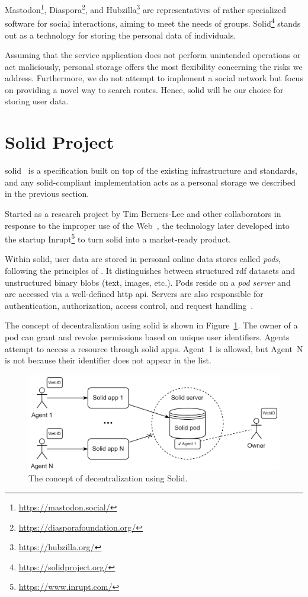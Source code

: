 Mastodon\footnote{\href{https://mastodon.social/}{https://mastodon.social/}}, Diaspora\footnote{\href{https://diasporafoundation.org/}{https://diasporafoundation.org/}}, and Hubzilla\footnote{\href{https://hubzilla.org/}{https://hubzilla.org/}} are representatives of rather specialized software for social interactions, aiming to meet the needs of groups. Solid\footnote{\href{https://solidproject.org/}{https://solidproject.org/}} stands out as a technology for storing the personal data of individuals.

\vspace{0.5em}

Assuming that the service application does not perform unintended operations or act maliciously, personal storage offers the most flexibility concerning the risks we address. Furthermore, we do not attempt to implement a social network but focus on providing a novel way to search routes. Hence, \acs{solid} will be our choice for storing user data.

\section{Solid Project}\label{sec:solid-project}


\ac{solid}~\cite{solid22} is a specification built on top of the existing infrastructure and standards, and any \acs{solid}-compliant implementation acts as a personal storage we described in the previous section.

Started as a research project by Tim Berners-Lee and other collaborators in response to the improper use of the Web~\cite{timbl09}, the technology later developed into the startup Inrupt\footnote{\href{https://www.inrupt.com/}{https://www.inrupt.com/}} to turn \acs{solid} into a market-ready product.

Within \acs{solid}, user data are stored in personal online data stores called \emph{pods}, following the principles of \emph{}. It distinguishes between structured \acs{rdf} datasets and unstructured binary blobs (text, images, etc.). Pods reside on a \emph{pod server} and are accessed via a well-defined \acs{http} \acs{api}. Servers are also responsible for authentication, authorization, access control, and request handling~\cite{mansour16}.

The concept of decentralization using \acs{solid} is shown in Figure~\ref{fig:concept-of-decentralization}. The owner of a pod can grant and revoke permissions based on unique user identifiers. Agents attempt to access a resource through \acs{solid} apps. Agent~1 is allowed, but Agent~N is not because their identifier does not appear in the list.

\begin{figure}[h!]
\centering
\includegraphics[width=0.75\linewidth]{img/concepts/concept-of-decentralization.png}
\caption{The concept of decentralization using Solid.}
\label{fig:concept-of-decentralization}
\end{figure}
